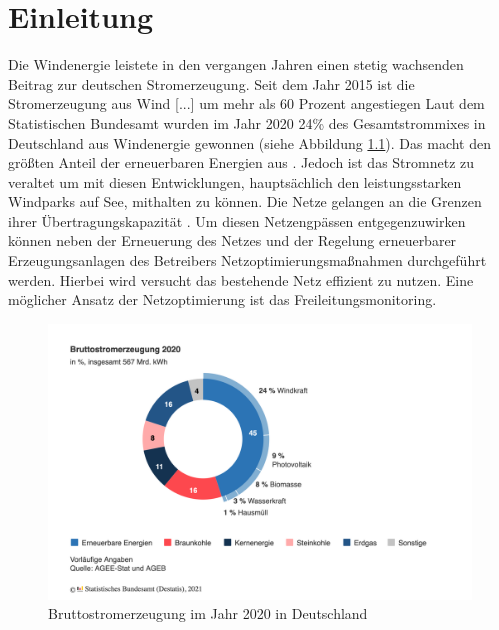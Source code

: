 \documentclass[
12pt, %
toc=listofnumbered, %
toc=chapterentrydotfill, %
numbers=noenddot, %
captions=tableheading, %
bibliography=numbered
]{scrreprt}
\newcommand{\qm}[1]{\glqq#1\grqq{}} %
\begin{document}
\tableofcontents
\chapter{Einleitung}\label{section:einleitung}

Die Windenergie leistete in den vergangen Jahren einen stetig wachsenden Beitrag zur deutschen Stromerzeugung. 
Seit dem Jahr 2015 \qm{ist die Stromerzeugung aus Wind [...] um mehr als 60 Prozent angestiegen} \cite{2021_Lewicki_ErneuerbareEnergienZahlen} Laut dem Statistischen Bundesamt wurden im Jahr 2020 24\% des Gesamtstrommixes in Deutschland aus Windenergie gewonnen (siehe Abbildung \ref{fig:strommix_deutschland}). Das macht den größten Anteil der erneuerbaren Energien aus \cite{2020__Bruttostromerzeugung2020}. Jedoch ist das Stromnetz zu veraltet um mit diesen Entwicklungen, hauptsächlich den leistungsstarken Windparks auf See, 
mithalten zu können. Die Netze \qm{gelangen an die Grenzen ihrer Übertragungskapazität} \cite{2015_Axthelm_BisFaktenZur}. 
Um diesen Netzengpässen entgegenzuwirken können neben der Erneuerung des Netzes und der Regelung erneuerbarer Erzeugungsanlagen 
des Betreibers Netzoptimierungsmaßnahmen durchgeführt werden. Hierbei wird versucht das bestehende Netz effizient zu nutzen. 
Eine möglicher Ansatz der Netzoptimierung ist das Freileitungsmonitoring.

\begin{figure}[tph]
	\begin{center}
		\includegraphics[width=.8\textwidth]{./images/bruttostromerzeugung-erneuerbare-energien.png}
		\caption{Bruttostromerzeugung im Jahr 2020 in Deutschland \cite{2020__Bruttostromerzeugung2020}}
		\label{fig:strommix_deutschland}
	\end{center}
\end{figure}
\end{document}
